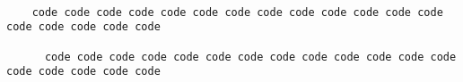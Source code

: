\documentclass{article}
\begin{document}
    \begin{verbatim}

    code code code code code code code code code code code code code code code code code code

      code code code code code code code code code code code code code code code code code code

    \end{verbatim}
\end{document}
